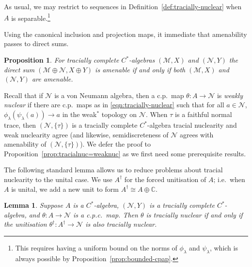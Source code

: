 \documentclass[a4paper,11pt]{amsart}
\newtheorem{lemma}[theorem]{Lemma}
\newtheorem{proposition}[theorem]{Proposition}
\theoremstyle{definition}
\numberwithin{equation}{section}
\numberwithin{theorem}{section}
\newcommand{\M}{\mathcal{M}}
\begin{document}
As usual, we may restrict to sequences in Definition~\ref{def:tracially-nuclear} when $A$ is separable.\footnote{This requires having a uniform bound on the norms of $\phi_\lambda$ and $\psi_\lambda$, which is always possible by Proposition~\ref{prop:bounded-cpap}.}  

Using the canonical inclusion and projection maps, it immediate that {}amenability passes to direct sums.
\begin{proposition}\label{prop:semidiscretenessdirectsums}
    For tracially complete $C^*$-algebras $(\M,X)$ and $(\mathcal N,Y)$ the direct sum $(\M\oplus\mathcal N,X\oplus Y)$ is {}amenable if and only if both $(\M,X)$ and $(\mathcal N,Y)$ are {}amenable.
\end{proposition}


Recall that if $\mathcal N$ is a von Neumann algebra, then a c.p.\ map $\theta\colon A\to \mathcal N$ is \emph{weakly nuclear} if there are c.p.\ maps as in \eqref{eqn:tracially-nuclear} such that for all $a\in \mathcal N$, $\phi_\lambda(\psi_\lambda(a))\rightarrow a$ in the weak$^*$ topology on $\mathcal N$.  When $\tau$ is a faithful normal trace, then $(\mathcal N,\{\tau\})$ is a tracially complete $C^*$-algebra tracial nuclearity and weak nuclearity agree (and likewise, semidiscreteness of $\mathcal N$ agrees with {}amenability of $(\mathcal N,\{\tau\})$).  We defer the proof to Proposition~\ref{prop:tracialnuc=weaknuc} as we first need some prerequisite results.






The following standard lemma allows us to reduce problems about tracial nuclearity to the unital case. We use $A^\dagger$ for the forced unitisation of $A$; i.e.\ when $A$ is unital, we add a new unit to form $A^\dagger\cong A\oplus \mathbb C$.

\begin{lemma}\label{lem:amenable-unitise}
	Suppose $A$ is a $C^*$-algebra, $(\mathcal N, Y)$ is a tracially complete $C^*$-algebra, and $\theta \colon A \rightarrow \mathcal N$ is a c.p.c.\ map. Then $\theta$ is tracially nuclear if and only if the unitisation $\theta^\dag \colon A^\dag \rightarrow \mathcal N$ is also tracially nuclear.
\end{lemma}
\end{document}
